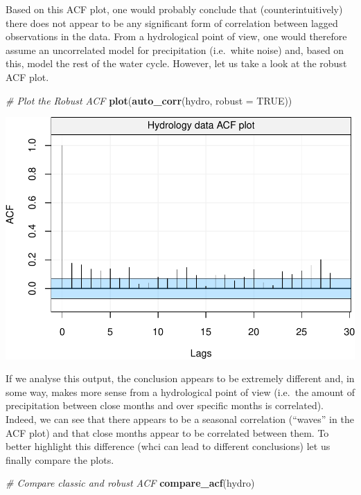 \documentclass[]{book}
\newenvironment{Shaded}{\begin{snugshade}}{\end{snugshade}}
\newcommand{\KeywordTok}[1]{\textcolor[rgb]{0.13,0.29,0.53}{\textbf{#1}}}
\newcommand{\DataTypeTok}[1]{\textcolor[rgb]{0.13,0.29,0.53}{#1}}
\newcommand{\CommentTok}[1]{\textcolor[rgb]{0.56,0.35,0.01}{\textit{#1}}}
\newcommand{\OtherTok}[1]{\textcolor[rgb]{0.56,0.35,0.01}{#1}}
\newcommand{\NormalTok}[1]{#1}
\theoremstyle{definition}
\theoremstyle{definition}
\theoremstyle{definition}
\theoremstyle{remark}
\begin{document}
Based on this ACF plot, one would probably conclude that
(counterintuitively) there does not appear to be any significant form of
correlation between lagged observations in the data. From a hydrological
point of view, one would therefore assume an uncorrelated model for
precipitation (i.e.~white noise) and, based on this, model the rest of
the water cycle. However, let us take a look at the robust ACF plot.

\begin{Shaded}
\begin{Highlighting}[]
\CommentTok{# Plot the Robust ACF}
\KeywordTok{plot}\NormalTok{(}\KeywordTok{auto_corr}\NormalTok{(hydro, }\DataTypeTok{robust =} \OtherTok{TRUE}\NormalTok{))}
\end{Highlighting}
\end{Shaded}

\includegraphics{ts_files/figure-latex/unnamed-chunk-24-1.pdf}

If we analyse this output, the conclusion appears to be extremely
different and, in some way, makes more sense from a hydrological point
of view (i.e.~the amount of precipitation between close months and over
specific months is correlated). Indeed, we can see that there appears to
be a seasonal correlation (``waves'' in the ACF plot) and that close
months appear to be correlated between them. To better highlight this
difference (whci can lead to different conclusions) let us finally
compare the plots.

\begin{Shaded}
\begin{Highlighting}[]
\CommentTok{# Compare classic and robust ACF}
\KeywordTok{compare_acf}\NormalTok{(hydro)}
\end{Highlighting}
\end{Shaded}
\end{document}
